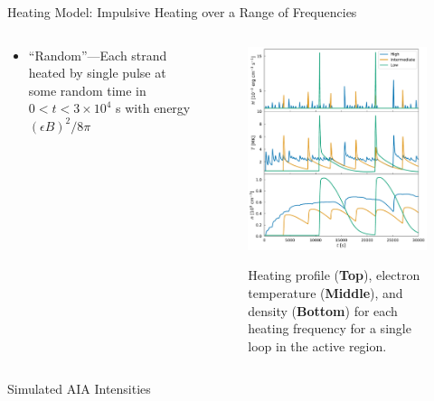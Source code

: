 \documentclass[final,12pt]{beamer}
\begin{document}
\begin{frame}
\begin{columns}[T]
\begin{column}{0.49\linewidth}
\begin{block}{Heating Model: Impulsive Heating over a Range of Frequencies}
\begin{columns}[c]
\begin{column}{0.5\columnwidth}
\begin{itemize}
\begin{itemize}
              \item ``Random''---Each strand heated by single pulse at some random time in $0<t<3\times10^4$ s with energy $(\epsilon B)^2/8\pi$
            \end{itemize}
          \end{itemize}
        \end{column}
        \begin{column}{0.48\columnwidth}
          \begin{figure}
            \includegraphics{../figures/hydro_profiles}
            \label{fig:hydro}
            \caption{Heating profile (\textbf{Top}), electron temperature (\textbf{Middle}), and density (\textbf{Bottom}) for each heating frequency for a single loop in the active region.}
          \end{figure}
        \end{column}
      \end{columns}
      \vspace{-1ex}
    \end{block}
    \begin{block}{Simulated AIA Intensities}

\end{block}
\end{column}
\end{columns}
\end{frame}
\end{document}
